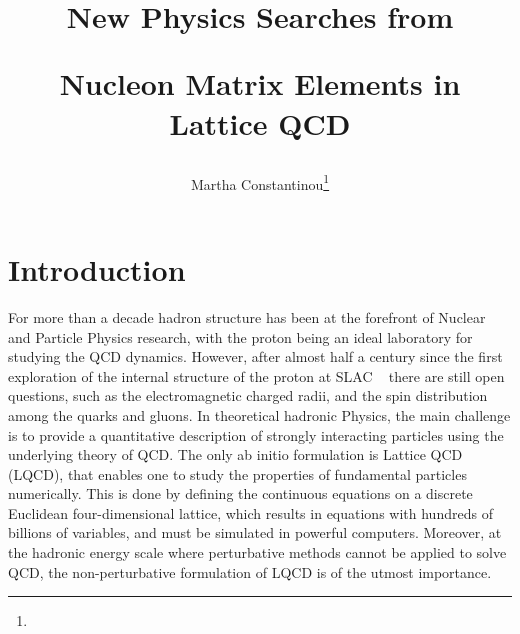 \documentclass[epj]{webofc}
\newcommand{\cl}{\centerline}
\begin{document}
%
\title{\cl{New Physics Searches from } \cl{Nucleon Matrix Elements in Lattice QCD}}
%
%

\author{Martha Constantinou\fnsep\thanks{}}


%
\maketitle
%
\section{Introduction}
\label{sec1}

For more than a decade hadron structure has been at the forefront of Nuclear and Particle Physics research, with the proton being an 
ideal laboratory for studying the QCD dynamics. However, after almost half a century since the first exploration of the internal structure 
of the proton at SLAC ~\cite{Breidenbach:1969kd,Bloom:1969kc} there are still open questions, such as the electromagnetic charged radii, 
and the spin distribution among the quarks and gluons. In theoretical hadronic Physics, the main challenge 
is to provide a quantitative description of strongly interacting particles using the underlying theory of QCD. The only ab initio formulation is 
Lattice QCD (LQCD), that enables one to study the properties of fundamental particles numerically. This is done by defining the continuous 
equations on a discrete Euclidean four-dimensional lattice, which results in equations with hundreds of billions of variables, and must be simulated 
in powerful computers. Moreover, at the hadronic energy scale where perturbative methods cannot be applied to solve QCD, the non-perturbative 
formulation of LQCD is of the utmost importance.
\end{document}
